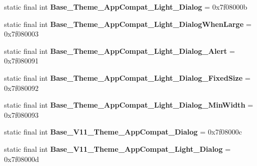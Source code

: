 \begin{DoxyCompactItemize}
\item 
\hypertarget{classandroid_1_1support_1_1v7_1_1appcompat_1_1_r_1_1style_afdae1fc80f953e632283e11338b1d9ef}{}static final int {\bfseries Base\+\_\+\+Theme\+\_\+\+App\+Compat\+\_\+\+Light\+\_\+\+Dialog} = 0x7f08000b\label{classandroid_1_1support_1_1v7_1_1appcompat_1_1_r_1_1style_afdae1fc80f953e632283e11338b1d9ef}

\item 
\hypertarget{classandroid_1_1support_1_1v7_1_1appcompat_1_1_r_1_1style_aac096fa4a63eb07be4009ae6325785ac}{}static final int {\bfseries Base\+\_\+\+Theme\+\_\+\+App\+Compat\+\_\+\+Light\+\_\+\+Dialog\+When\+Large} = 0x7f080003\label{classandroid_1_1support_1_1v7_1_1appcompat_1_1_r_1_1style_aac096fa4a63eb07be4009ae6325785ac}

\item 
\hypertarget{classandroid_1_1support_1_1v7_1_1appcompat_1_1_r_1_1style_acde9422ae8c11ea0144daceddb2885f8}{}static final int {\bfseries Base\+\_\+\+Theme\+\_\+\+App\+Compat\+\_\+\+Light\+\_\+\+Dialog\+\_\+\+Alert} = 0x7f080091\label{classandroid_1_1support_1_1v7_1_1appcompat_1_1_r_1_1style_acde9422ae8c11ea0144daceddb2885f8}

\item 
\hypertarget{classandroid_1_1support_1_1v7_1_1appcompat_1_1_r_1_1style_a5f39b1dc9c0baf075c95d9ad78ebcb5f}{}static final int {\bfseries Base\+\_\+\+Theme\+\_\+\+App\+Compat\+\_\+\+Light\+\_\+\+Dialog\+\_\+\+Fixed\+Size} = 0x7f080092\label{classandroid_1_1support_1_1v7_1_1appcompat_1_1_r_1_1style_a5f39b1dc9c0baf075c95d9ad78ebcb5f}

\item 
\hypertarget{classandroid_1_1support_1_1v7_1_1appcompat_1_1_r_1_1style_add0b859f850814a0f0994f7da25148df}{}static final int {\bfseries Base\+\_\+\+Theme\+\_\+\+App\+Compat\+\_\+\+Light\+\_\+\+Dialog\+\_\+\+Min\+Width} = 0x7f080093\label{classandroid_1_1support_1_1v7_1_1appcompat_1_1_r_1_1style_add0b859f850814a0f0994f7da25148df}

\item 
\hypertarget{classandroid_1_1support_1_1v7_1_1appcompat_1_1_r_1_1style_a8c7529baff896f21e19183dbd4ca22db}{}static final int {\bfseries Base\+\_\+\+V11\+\_\+\+Theme\+\_\+\+App\+Compat\+\_\+\+Dialog} = 0x7f08000c\label{classandroid_1_1support_1_1v7_1_1appcompat_1_1_r_1_1style_a8c7529baff896f21e19183dbd4ca22db}

\item 
\hypertarget{classandroid_1_1support_1_1v7_1_1appcompat_1_1_r_1_1style_ae47b7ad929a64384840f0bbd2e88d5ee}{}static final int {\bfseries Base\+\_\+\+V11\+\_\+\+Theme\+\_\+\+App\+Compat\+\_\+\+Light\+\_\+\+Dialog} = 0x7f08000d\label{classandroid_1_1support_1_1v7_1_1appcompat_1_1_r_1_1style_ae47b7ad929a64384840f0bbd2e88d5ee}


\end{DoxyCompactItemize}
